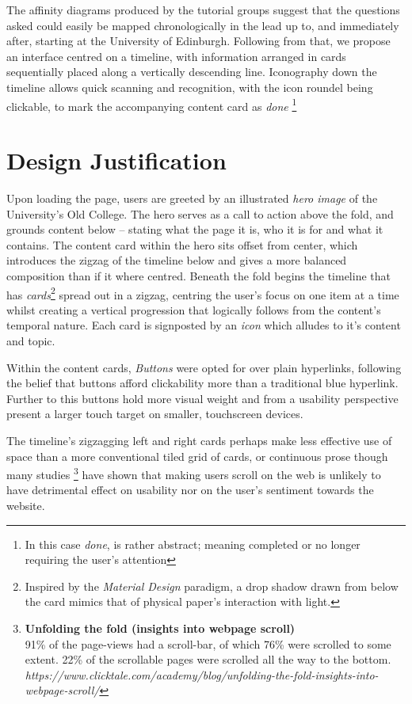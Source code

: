 \documentclass[a4paper, notoc]{tufte-handout}
\begin{document}
The affinity diagrams produced by the tutorial groups suggest that the questions asked could 
easily be mapped chronologically in the lead up to, and immediately after, starting at the 
University of Edinburgh. Following from that, we propose an interface centred on a timeline, 
with information arranged in cards sequentially placed along a vertically descending line. 
Iconography down the timeline allows quick scanning and recognition, with the icon roundel 
being clickable, to mark the accompanying content card as \textit{done}
\footnote{In this case \textit{done}, is rather abstract; meaning completed or no longer 
requiring the user's attention}


\section{Design Justification}\label{sec:design-justification}

Upon loading the page, users are greeted by an illustrated \textit{hero image} of the 
University's Old College. The hero serves as a call to action above the fold, and grounds 
content below -- stating what the page it is, who it is for and what it contains. The content 
card within the hero sits offset from center, which introduces the zigzag of the timeline 
below and gives a more balanced composition than if it where centred. Beneath the fold begins 
the timeline that has \textit{cards}\footnote{Inspired by 
the \textit{Material Design} paradigm, a drop shadow drawn from below the card mimics that 
of physical paper's interaction with light.} spread out in a zigzag, centring the user's 
focus on one item at a time whilst creating a vertical progression that logically follows 
from the content's temporal nature. Each card is signposted by an \textit{icon} which alludes 
to it's content and topic. 

Within the content cards, \textit{Buttons} were opted for over plain hyperlinks, following 
the belief that buttons afford clickability more than a traditional blue hyperlink. Further 
to this buttons hold more visual weight and from a usability perspective present a larger 
touch target on smaller, touchscreen devices.

The timeline's zigzagging left and right cards perhaps make less effective use of space than
a more conventional tiled grid of cards, or continuous prose though many studies
\footnote{\textbf{Unfolding the fold (insights into webpage scroll)}\\
91\% of the page-views had a scroll-bar, of which
76\% were scrolled to some extent.
22\% of the scrollable pages were scrolled all the way to the bottom.
\textit{https://www.clicktale.com/academy/blog/unfolding-the-fold-insights-into-webpage-scroll/}}
have shown that making users scroll on the web is unlikely to have detrimental effect on usability
nor on the user's sentiment towards the website.
\end{document}
